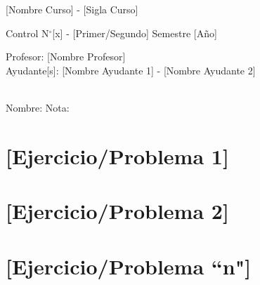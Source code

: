 \documentclass[letterpaper,11pt,oneside]{article}
\newcommand{\grad}{$^{\circ}$}
\begin{document}
	\begin{center}
		{\Large [Nombre Curso] - [Sigla Curso]}
		\par {\large Control N\grad [x] - [Primer/Segundo] Semestre [Año]}
	\end{center}

	\begin{center}
		Profesor: [Nombre Profesor]\\
		Ayudante[s]: [Nombre Ayudante 1] - [Nombre Ayudante 2]
	\end{center}
	\ \ \\
	Nombre: \underline{\hspace{10.4cm}}\hspace{1cm} Nota: \underline{\hspace{2.1cm}}
	
\section*{[Ejercicio/Problema 1]}

\section*{[Ejercicio/Problema 2]}

\section*{[Ejercicio/Problema ``n"]}
\end{document}
